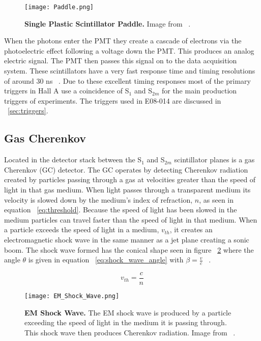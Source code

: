 \begin{figure}[!ht]
\begin{center}
\texttt{[image: Paddle.png]}
\end{center}
\caption{
{\bf{Single Plastic Scintillator Paddle.}} Image from ~\cite{Thesis:Wang}.}
\label{fig:paddle}
\end{figure}

When the photons enter the PMT they create a cascade of electrons via the photoelectric effect following a voltage down the PMT. This produces an analog electric signal. The PMT then passes this signal on to the data acquisition system. These scintillators have a very fast response time and timing resolutions of around 30 ns ~\cite{Thesis:Ye}. Due to these excellent timing responses most of the primary triggers in Hall A use a coincidence of S$_1$ and S$_{2m}$ for the main production triggers of experiments. The triggers used in E08-014 are discussed in ~\ref{sec:triggers}. 

\subsection{Gas Cherenkov}
\label{ssec:gc}

Located in the detector stack between the S$_1$ and S$_{2m}$ scintillator planes is a gas Cherenkov (GC) detector. The GC operates by detecting Cherenkov radiation created by particles passing through a gas at velocities greater than the speed of light in that gas medium. When light passes through a transparent medium its velocity is slowed down by the medium's index of refraction, $n$, as seen in equation ~\ref{eq:threshold}. Because the speed of light has been slowed in the medium particles can travel faster than the speed of light in that medium. When a particle exceeds the speed of light in a medium, $v_{th}$, it creates an electromagnetic shock wave in the same manner as a jet plane creating a sonic boom. The shock wave formed has the conical shape seen in figure ~\ref{fig:em_shock_wave} where the angle $\theta$ is given in equation ~\ref{eq:shock_wave_angle} with $\beta = \frac{v}{c}$ ~\cite{Book:Leo}.

\begin{equation} \label{eq:threshold}
	v_{th} = \frac{c}{n}
\end{equation}

\begin{figure}[!ht]
\begin{center}
\texttt{[image: EM\_Shock\_Wave.png]}
\end{center}
\caption{
{\bf{EM Shock Wave.}} The EM shock wave is produced by a particle exceeding the speed of light in the medium it is passing through. This shock wave then produces Cherenkov radiation. Image from ~\cite{Thesis:Cummings}.}
\label{fig:em_shock_wave}
\end{figure}

